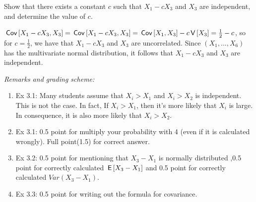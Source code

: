 \begin{exercise}[1]
Show that there exists a constant $c$ such that $X_1 - c X_3$ and $X_3$ are independent, and determine the value of $c$. 
\begin{solution}
  $\,\mathsf{Cov}\left[X_1 - c X_3, X_3\right] = \,\mathsf{Cov}\left[X_1 - c X_3, X_3\right] = \,\mathsf{Cov}\left[X_1, X_3\right] - c\,\mathsf{V}\left[X_3\right] = \tfrac12- c$, so for $c = \tfrac12$, we have that $X_1 - c X_3$ and $X_3$ are uncorrelated. Since $(X_1,...,X_6)$ has the multivariate normal distribution, it follows that $X_1 - c X_3$ and $X_3$ are independent.
\end{solution}
\end{exercise}

\noindent \textit{Remarks and grading scheme:}
\begin{enumerate}
    \item Ex 3.1: Many students assume that $X_i>X_1$ and $X_i>X_2$ is independent. This is not the case. In fact,  If $X_i > X_1$, then it's more likely that $X_i$ is large. In consequence, it is also more likely that $X_i > X_2$.
    \item Ex 3.1: 0.5 point for multiply your probability with 4 (even if it is calculated wrongly). Full point(1.5) for correct answer.
    \item Ex 3.2: 0.5 point for mentioning that $X_3-X_1$ is normally distributed ,0.5 point for correctly calculated $\,\mathsf{E}\left[X_3-X_1\right]$ and 0.5 point for correctly calculated $Var(X_3-X_1)$.
    \item Ex 3.3: 0.5 point for writing out the formula for covariance.
\end{enumerate}
